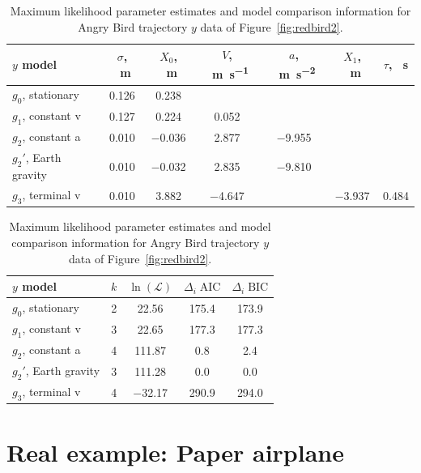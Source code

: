 \begin{table}
\caption{Maximum likelihood parameter estimates and model comparison information for Angry Bird trajectory $y$ data of Figure~\ref{fig:redbird2}.} 
\label{tbl:redbirdy}
\begin{tabular}{lcccccc}
$y$ model & $\sigma$, \SI{}{\meter} & $X_0$, \SI{}{\meter} & $V$, \SI{}{\meter\per\second} & $a$, \SI{}{\meter\per\second\squared} & $X_1$, \SI{}{\meter} & $\tau$, \SI{}{\second} \\
\hline
$g_0$, stationary & \num{0.126} & \num{0.238} & \num{} & \num{} & \num{} & \num{} \\
$g_1$, constant v & \num{0.127} & \num{0.224} & \num{0.052} & & & \\
$g_2$, constant a & \num{0.010} & \num{-0.036} & \num{2.877} & \num{-9.955} & & \\
\rowcolor[gray]{0.8} $g_2'$, Earth gravity & \num{0.010} & \num{-0.032} & \num{2.835} & \num{-9.810} & & \\
$g_3$, terminal v & \num{0.010} & \num{3.882} & \num{-4.647} & \num{} & \num{-3.937} & \num{0.484} \\
\end{tabular}

\begin{tabular}{lcccc}
$y$ model & $k$ & $\ln(\mathcal{L})$ & $\Delta_i\;\text{AIC}$ & $\Delta_i\;\text{BIC}$ \\
\hline
$g_0$, stationary & 2 & \num{22.56} & \num{175.4} & \num{173.9}  \\
$g_1$, constant v & 3 & \num{22.65} & \num{177.3} & \num{177.3} \\
$g_2$, constant a & 4 & \num{111.87} & \num{0.8} & \num{2.4} \\
\rowcolor[gray]{0.8} $g_2'$, Earth gravity & 3 & \num{111.28} & \num{0.0} &  \num{0.0} \\
$g_3$, terminal v & 4 & \num{-32.17} & \num{290.9} & \num{294.0} \\
\end{tabular}
\end{table}



\section{Real example:  Paper airplane}

